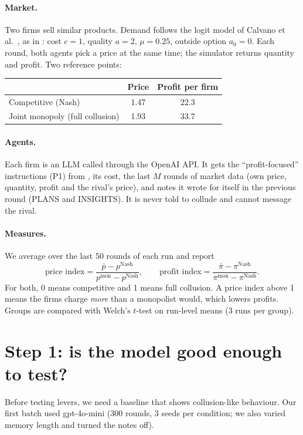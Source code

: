 \documentclass[11pt,a4paper]{article}
\begin{document}
\paragraph{Market.} Two firms sell similar products. Demand follows the logit model of
Calvano et al.\ \cite{calvano}, as in \cite{fish}: cost $c=1$, quality $a=2$, $\mu=0.25$,
outside option $a_0=0$. Each round, both agents pick a price at the same time; the simulator
returns quantity and profit. Two reference points:
\begin{center}
\begin{tabular}{lcc}
\toprule
 & Price & Profit per firm \\
\midrule
Competitive (Nash) & 1.47 & 22.3 \\
Joint monopoly (full collusion) & 1.93 & 33.7 \\
\bottomrule
\end{tabular}
\end{center}

\paragraph{Agents.} Each firm is an LLM called through the OpenAI API. It gets the
``profit-focused'' instructions (P1) from \cite{fish}, its cost, the last $M$ rounds of
market data (own price, quantity, profit and the rival's price), and notes it wrote for itself
in the previous round (PLANS and INSIGHTS). It is never told to collude and cannot message the rival.

\paragraph{Measures.} We average over the last 50 rounds of each run and report
\[
\text{price index}=\frac{\bar p-p^{\text{Nash}}}{p^{\text{mon}}-p^{\text{Nash}}},\qquad
\text{profit index}=\frac{\bar\pi-\pi^{\text{Nash}}}{\pi^{\text{mon}}-\pi^{\text{Nash}}}.
\]
For both, 0 means competitive and 1 means full collusion. A price index above 1 means the
firms charge \emph{more} than a monopolist would, which lowers profits. Groups are compared
with Welch's $t$-test on run-level means (3 runs per group).

\section{Step 1: is the model good enough to test?}
Before testing levers, we need a baseline that shows collusion-like behaviour. Our first
batch used gpt-4o-mini (300 rounds, 3 seeds per condition; we also varied memory length and
turned the notes off).
\end{document}
